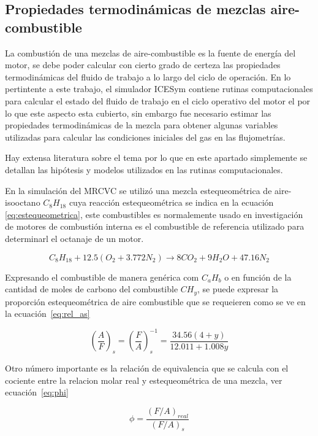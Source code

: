 \subsection{Propiedades termodinámicas de mezclas aire-combustible}\label{subsec:prop_mezcla}
%
La combustión de una mezclas de aire-combustible es la fuente de energía del
motor, se debe poder calcular con cierto grado de certeza las propiedades
termodinámicas del fluido de trabajo a lo largo del ciclo de operación.
%
En lo pertintente a este trabajo, el simulador ICESym contiene rutinas
computacionales para calcular el estado del fluido de trabajo en el ciclo
operativo del motor el por lo que este aspecto esta cubierto, sin embargo fue
necesario estimar las propiedades termodinámicas de la mezcla para obtener
algunas variables utilizadas para calcular las condiciones iniciales del gas en
las flujometrías.

Hay extensa literatura sobre el tema por lo que en este apartado simplemente se
detallan las hipótesis y modelos utilizados en las rutinas computacionales.

En la simulación del MRCVC se utilizó una mezcla estequeométrica de
aire-isooctano $C_{8}H_{18}$ cuya reacción estequeométrica se indica en la
ecuación \ref{eq:estequeometrica}, este combustibles es normalemente usado en
investigación de motores de combustión interna es el combustible de referencia
utilizado para determinarl el octanaje de un motor.

\begin{equation} \label{eq:estequeometrica}
  C_{8}H_{18} + 12.5 \left(O_{2}+3.772N_{2}\right) \rightarrow 8 CO_{2} + 9 H_{2}O + 47.16 N_{2}
\end{equation}

Expresando el combustible de manera genérica com $C_{a}H_{b}$ o en función de la cantidad
de moles de carbono del combustible $CH_{y}$, se puede expresar la proporción estequeométrica
de aire combustible que se requeieren como se ve en la ecuación~\ref{eq:rel_as}

\begin{equation} \label{eq:rel_as}
  \left(\frac{A}{F}\right)_{s} = \left(\frac{F}{A}\right)_{s}^{-1} = \frac{34.56(4+y)}{12.011 + 1.008y}
\end{equation}


Otro número importante es la relación de equivalencia que se calcula con el
cociente entre la relacion molar real y estequeométrica de una mezcla, ver
ecuación~\ref{eq:phi}

\begin{equation}\label{eq:phi}
  \phi = \frac{{(F/A)}_{real}}{{(F/A)}_{s}}
\end{equation}

